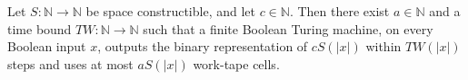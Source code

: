 \begin{theorem}
\label{WordRAM.wordSizeComputable_of_spaceConstructible}
\leanok
{}
Let $S:\mathbb{N}\to\mathbb{N}$ be space constructible, and let $c\in\mathbb{N}$. Then
there exist $a\in\mathbb{N}$ and a time bound $TW:\mathbb{N}\to\mathbb{N}$ such that a
finite Boolean Turing machine, on every Boolean input $x$, outputs the binary
representation of $cS(|x|)$ within $TW(|x|)$ steps and uses at most $aS(|x|)$ work-tape
cells.
\end{theorem}
